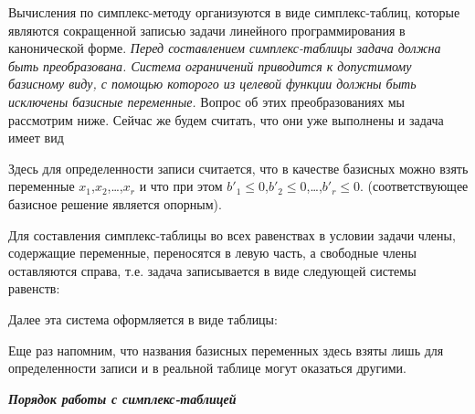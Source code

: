 \documentclass{article}
\begin{document}
Вычисления по симплекс-методу организуются в виде симплекс-таблиц, которые являются сокращенной записью задачи линейного программирования в канонической форме. \textit{Перед составлением симплекс-таблицы задача должна быть преобразована. Система ограничений приводится к допустимому базисному виду, с помощью которого из целевой функции должны быть исключены базисные  переменные.} Вопрос об этих преобразованиях мы рассмотрим ниже. Сейчас же будем считать, что они уже выполнены и задача имеет вид

Здесь для определенности записи считается, что в качестве базисных можно взять переменные $x_1$,$x_2$,\dots,$x_r$ и что при этом $b'_1 \leq 0$,$b'_2 \leq 0$,\dots,$b'_r \leq 0$. (соответствующее  базисное решение является опорным).

Для составления симплекс-таблицы во всех равенствах в условии  задачи члены, содержащие переменные, переносятся в левую часть, а свободные члены оставляются справа, т.е. задача записывается в виде следующей системы равенств:

Далее эта система оформляется  в виде таблицы:

Еще раз напомним, что названия базисных переменных здесь взяты лишь для определенности записи и в реальной таблице могут оказаться другими.
\begin{center}
\textit{\textbf{Порядок работы с симплекс-таблицей}}
\end{center}
\end{document}
